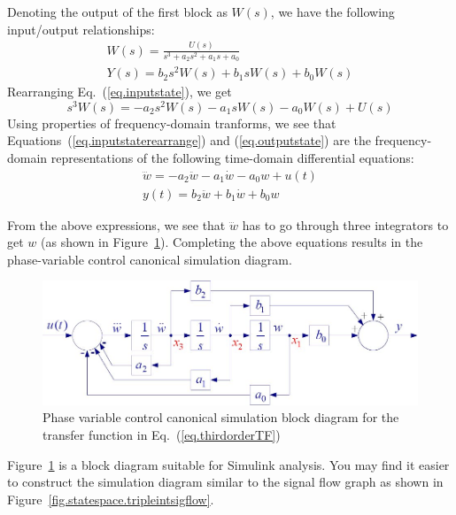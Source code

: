 Denoting the output of the first block as $W(s)$, we have the following input/output relationships:
\begin{subequations}
\begin{gather}
    W(s) = \frac{U(s)}{s^3 + a_2 s^2 + a_1 s + a_0}
        \label{eq.inputstate} \\
    Y(s) = b_2 s^2 W(s) + b_1 s W(s) + b_0 W(s)
        \label{eq.outputstate}
\end{gather}
\end{subequations}
Rearranging Eq.\ (\ref{eq.inputstate}), we get
\begin{equation}
    s^3 W(s) = -a_2 s^2 W(s) - a_1 s W(s) - a_0 W(s) + U(s)
    \label{eq.inputstaterearrange}
\end{equation}
Using properties of frequency-domain tranforms, we see that Equations~(\ref{eq.inputstaterearrange}) and (\ref{eq.outputstate}) are the frequency-domain representations of the following time-domain differential equations:
\begin{subequations}
\begin{gather}
    \dddot{w} = -a_2 \ddot{w} - a_1 \dot{w} - a_0 w + u(t) \\
    y(t) = b_2 \ddot{w} + b_1 \dot{w} + b_0 w
\end{gather}
\end{subequations}

From the above expressions, we see that $\dddot{w}$ has to go through three integrators to get $w$ (as shown in Figure~\ref{fig.statespace.tripleintblock}).  Completing the above equations results in the phase-variable control canonical simulation diagram.

\begin{figure}[hbt]
\centering
\includegraphics[width=.9\textwidth]{tripleintblock}
\caption{\footnotesize
        Phase variable control canonical simulation block diagram for the transfer function in Eq.~(\ref{eq.thirdorderTF})
        \label{fig.statespace.tripleintblock}
        }
\end{figure}

Figure~\ref{fig.statespace.tripleintblock} is a block diagram suitable for Simulink analysis.  You may find it easier to construct the simulation diagram similar to the signal flow graph as shown in Figure~\ref{fig.statespace.tripleintsigflow}.

